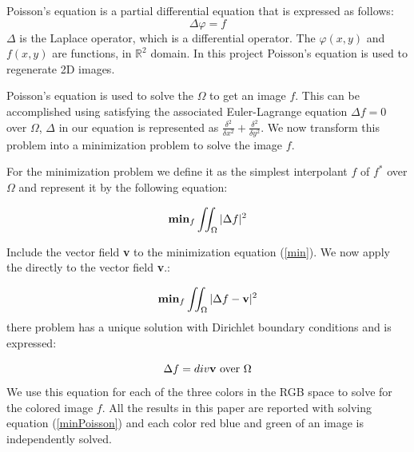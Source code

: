 \documentclass[10pt,twopage]{acmsiggraph}
\begin{document}
Poisson's equation is a partial differential equation that is expressed as follows:
\begin{equation} 
\ensuremath{\Delta \varphi = f}
\end{equation}
\ensuremath{\Delta} is the Laplace operator, which is a differential operator. The \ensuremath{ \varphi(x,y) } and $ f(x,y) $ are functions, in $\mathbb{R}^2$ domain. In this project Poisson's equation is used to regenerate 2D images. 






Poisson's equation is used to solve the \ensuremath{\Omega} to get an image $f$. This can be accomplished using satisfying the associated Euler-Lagrange equation \ensuremath{\Delta f = 0} over \ensuremath{\Omega}, \ensuremath{\Delta} in our equation is represented as \ensuremath{\frac{\delta^2}{\delta x^2} + \frac{\delta^2}{\delta y^2}}. We now transform this problem into a minimization problem to solve the image $f$.

For the minimization problem we define it as the simplest interpolant $f$ of $f^*$ over \ensuremath{\Omega} and represent it by the following equation:

\begin{equation}
\ensuremath{{\bf min}_f \iint_{\Omega}{|\Delta f|^2}}
\label{min}
\end{equation}

Include the vector field {\bf v} to the minimization equation (\ref{min}). We now apply the directly to the vector field {\bf v}.:

\begin{equation}
{\bf min}_f \iint_{\Omega}{|\Delta f - {\bf v}|^2}
\label{minPoisson}
\end{equation}
there problem has a unique solution with Dirichlet boundary conditions and is expressed:

\begin{equation}
\Delta f = div {\bf v} \mbox{ over \ensuremath{\Omega}}
\label{poissonEqn}
\end{equation}
We use this equation for each of the three colors in the RGB space to solve for the colored image $f$. All the results in this paper are reported with solving equation (\ref{minPoisson}) and each color red blue and green of an image is independently solved. 
\end{document}
